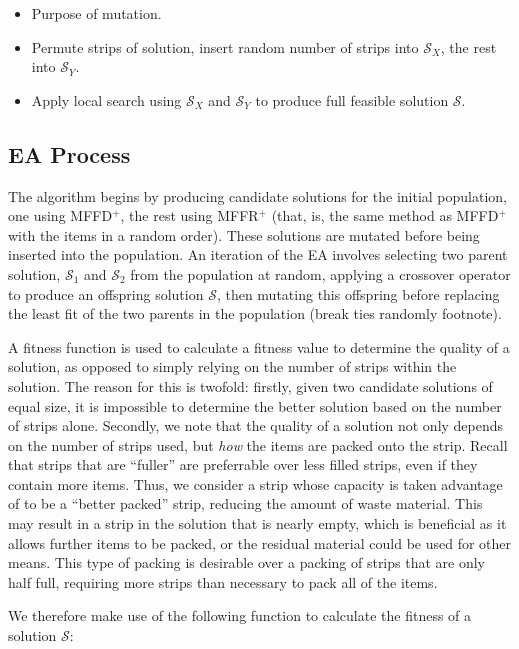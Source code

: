 \documentclass{elsarticle}
\begin{document}
\begin{itemize}
	\item Purpose of mutation.
	\item Permute strips of solution, insert random number of strips into $\mathcal{S}_X$, the rest into $\mathcal{S}_Y$.
	\item Apply local search using $\mathcal{S}_X$ and $\mathcal{S}_Y$ to produce full feasible solution $\mathcal{S}$.
\end{itemize}

\subsection{EA Process}
\label{sub:eaframework}
The algorithm begins by producing candidate solutions for the initial population, one using MFFD$^+$, the rest using MFFR$^+$ (that, is, the same method as MFFD$^+$ with the items in a random order). These solutions are mutated before being inserted into the population. An iteration of the EA involves selecting two parent solution, $\mathcal{S}_1$ and $\mathcal{S}_2$ from the population at random, applying a crossover operator to produce an offspring solution $\mathcal{S}$, then mutating this offspring before replacing the least fit of the two parents in the population (break ties randomly footnote). 

A fitness function is used to calculate a fitness value to determine the quality of a solution, as opposed to simply relying on the number of strips within the solution. The reason for this is twofold: firstly, given two candidate solutions of equal size, it is impossible to determine the better solution based on the number of strips alone. Secondly, we note that the quality of a solution not only depends on the number of strips used, but \emph{how} the items are packed onto the strip. Recall that strips that are ``fuller'' are preferrable over less filled strips, even if they contain more items. Thus, we consider a strip whose capacity is taken advantage of to be a ``better packed'' strip, reducing the amount of waste material. This may result in a strip in the solution that is nearly empty, which is beneficial as it allows further items to be packed, or the residual material could be used for other means. This type of packing is desirable over a packing of strips that are only half full, requiring more strips than necessary to pack all of the items. 

We therefore make use of the following function to calculate the fitness of a solution $\mathcal{S}$:
\end{document}
